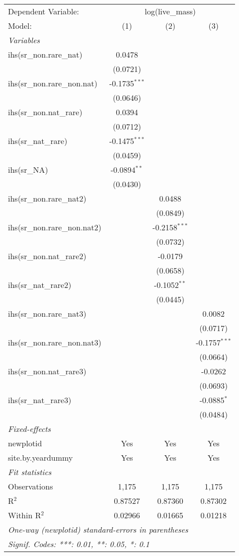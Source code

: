 \begin{tabular}{lccc}
\tabularnewline\midrule\midrule
Dependent Variable:&\multicolumn{3}{c}{log(live\_mass)}\\
Model:&(1) & (2) & (3)\\
\midrule \emph{Variables}&   &   &  \\
ihs(sr\_non.rare\_nat)&0.0478 &    &   \\
  &(0.0721) &    &   \\
ihs(sr\_non.rare\_non.nat)&-0.1735$^{***}$ &    &   \\
  &(0.0646) &    &   \\
ihs(sr\_non.nat\_rare)&0.0394 &    &   \\
  &(0.0712) &    &   \\
ihs(sr\_nat\_rare)&-0.1475$^{***}$ &    &   \\
  &(0.0459) &    &   \\
ihs(sr\_NA)&-0.0894$^{**}$ &    &   \\
  &(0.0430) &    &   \\
ihs(sr\_non.rare\_nat2)&   & 0.0488 &   \\
  &   & (0.0849) &   \\
ihs(sr\_non.rare\_non.nat2)&   & -0.2158$^{***}$ &   \\
  &   & (0.0732) &   \\
ihs(sr\_non.nat\_rare2)&   & -0.0179 &   \\
  &   & (0.0658) &   \\
ihs(sr\_nat\_rare2)&   & -0.1052$^{**}$ &   \\
  &   & (0.0445) &   \\
ihs(sr\_non.rare\_nat3)&   &    & 0.0082\\
  &   &    & (0.0717)\\
ihs(sr\_non.rare\_non.nat3)&   &    & -0.1757$^{***}$\\
  &   &    & (0.0664)\\
ihs(sr\_non.nat\_rare3)&   &    & -0.0262\\
  &   &    & (0.0693)\\
ihs(sr\_nat\_rare3)&   &    & -0.0885$^{*}$\\
  &   &    & (0.0484)\\
\midrule \emph{Fixed-effects}&   &   &  \\
newplotid & Yes & Yes & Yes\\
site.by.yeardummy & Yes & Yes & Yes\\
\midrule \emph{Fit statistics}&  & & \\
Observations & 1,175&1,175&1,175\\
R$^2$ & 0.87527&0.87360&0.87302\\
Within R$^2$ & 0.02966&0.01665&0.01218\\
\midrule\midrule\multicolumn{4}{l}{\emph{One-way (newplotid) standard-errors in parentheses}}\\
\multicolumn{4}{l}{\emph{Signif. Codes: ***: 0.01, **: 0.05, *: 0.1}}\\
\end{tabular}



